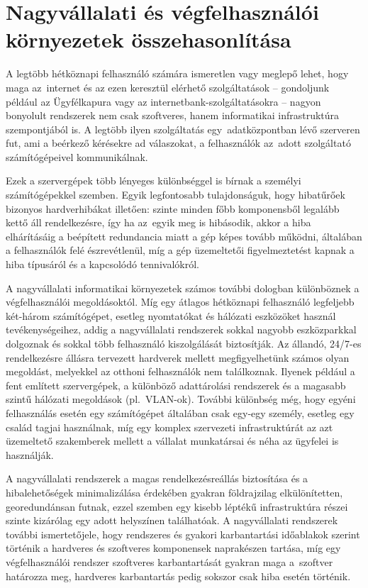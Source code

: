 \section{Nagyvállalati és végfelhasználói környezetek összehasonlítása}
A legtöbb hétköznapi felhasználó számára ismeretlen vagy meglepő lehet, hogy maga az~internet és az ezen keresztül elérhető szolgáltatások -- gondoljunk például az Ügyfélkapura vagy az internetbank-szolgáltatásokra -- nagyon bonyolult rendszerek nem csak szoftveres, hanem informatikai infrastruktúra szempontjából is. A legtöbb ilyen szolgáltatás egy~adatközpontban lévő szerveren fut, ami a beérkező kérésekre ad válaszokat, a felhasználók az~adott szolgáltató számítógépeivel kommunikálnak.

Ezek a szervergépek több lényeges különbséggel is bírnak a személyi számítógépekkel szemben. Egyik legfontosabb tulajdonságuk, hogy hibatűrőek bizonyos hardverhibákat illetően: szinte minden főbb komponensből legalább kettő áll rendelkezésre, így ha az~egyik meg is hibásodik, akkor a hiba elhárításáig a beépített redundancia miatt a gép képes tovább működni, általában a felhasználók felé észrevétlenül, míg a gép üzemeltetői figyelmeztetést kapnak a hiba típusáról és a kapcsolódó tennivalókról.

A nagyvállalati informatikai környezetek számos további dologban különböznek a végfelhasználói megoldásoktól. Míg egy átlagos hétköznapi felhasználó legfeljebb két-három számítógépet, esetleg nyomtatókat és hálózati eszközöket használ tevékenységeihez, addig a nagyvállalati rendszerek sokkal nagyobb eszközparkkal dolgoznak és sokkal több felhasználó kiszolgálását biztosítják. Az állandó, 24/7-es rendelkezésre állásra tervezett hardverek mellett megfigyelhetünk számos olyan megoldást, melyekkel az otthoni felhasználók nem találkoznak. Ilyenek például a fent említett szervergépek, a különböző adattárolási rendszerek és a magasabb szintű hálózati megoldások (pl.~VLAN-ok). További különbség még, hogy egyéni felhasználás esetén egy számítógépet általában csak egy-egy személy, esetleg egy család tagjai használnak, míg egy komplex szervezeti infrastruktúrát az azt üzemeltető szakemberek mellett a vállalat munkatársai és néha az ügyfelei is használják.

A nagyvállalati rendszerek a magas rendelkezésreállás biztosítása és a hibalehetőségek minimalizálása érdekében gyakran földrajzilag elkülönítetten, georedundánsan futnak, ezzel szemben egy kisebb léptékű infrastruktúra részei szinte kizárólag egy adott helyszínen találhatóak. A nagyvállalati rendszerek további ismertetőjele, hogy rendszeres és gyakori karbantartási időablakok szerint történik a hardveres és szoftveres komponensek naprakészen tartása, míg egy végfelhasználói rendszer szoftveres karbantartását gyakran maga a~szoftver határozza meg, hardveres karbantartás pedig sokszor csak hiba esetén történik.

